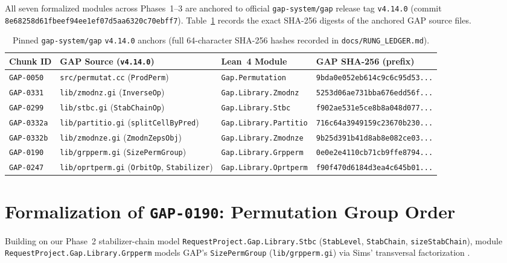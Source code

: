 \documentclass[11pt,a4paper]{article}
\begin{document}
All seven formalized modules across Phases~1--3 are anchored to official \texttt{gap-system/gap} release tag \texttt{v4.14.0} (commit \texttt{8e68258d61fb\allowbreak eef94ee1ef07\allowbreak d5aa6320c70ebff7}). Table~\ref{tab:anchors} records the exact SHA-256 digests of the anchored GAP source files.

\begin{table}[h!]
\centering
\scriptsize
\begin{tabularx}{\textwidth}{@{}l X l l@{}}
\toprule
\textbf{Chunk ID} & \textbf{GAP Source (\texttt{v4.14.0})} & \textbf{Lean~4 Module} & \textbf{GAP SHA-256 (prefix)} \\
\midrule
\texttt{GAP-0050} & \texttt{src/permutat.cc} (\texttt{ProdPerm}) & \texttt{Gap.Permutation} & \texttt{9bda0e052eb614c9c6c95d53...} \\
\texttt{GAP-0331} & \texttt{lib/zmodnz.gi} (\texttt{InverseOp}) & \texttt{Gap.Library.Zmodnz} & \texttt{5253d06ae731bba676edd56f...} \\
\texttt{GAP-0299} & \texttt{lib/stbc.gi} (\texttt{StabChainOp}) & \texttt{Gap.Library.Stbc} & \texttt{f902ae531e5ce8b8a048d077...} \\
\texttt{GAP-0332a} & \texttt{lib/partitio.gi} (\texttt{splitCellByPred}) & \texttt{Gap.Library.Partitio} & \texttt{716c64a3949159c23670b230...} \\
\texttt{GAP-0332b} & \texttt{lib/zmodnze.gi} (\texttt{ZmodnZepsObj}) & \texttt{Gap.Library.Zmodnze} & \texttt{9b25d391b41d8ab8e082ce03...} \\
\texttt{GAP-0190} & \texttt{lib/grpperm.gi} (\texttt{SizePermGroup}) & \texttt{Gap.Library.Grpperm} & \texttt{0e0e2e4110cb71cb9ffe8794...} \\
\texttt{GAP-0247} & \texttt{lib/oprtperm.gi} (\texttt{OrbitOp}, \texttt{Stabilizer}) & \texttt{Gap.Library.Oprtperm} & \texttt{f90f470d6184d3ea4c645b01...} \\
\bottomrule
\end{tabularx}
\caption{Pinned \texttt{gap-system/gap} \texttt{v4.14.0} anchors (full 64-character SHA-256 hashes recorded in \texttt{docs/RUNG\_LEDGER.md}).}
\label{tab:anchors}
\end{table}

\section{Formalization of \texttt{GAP-0190}: Permutation Group Order}
\label{sec:grpperm}

Building on our Phase~2 stabilizer-chain model \texttt{RequestProject.\allowbreak Gap.Library.\allowbreak Stbc} (\texttt{StabLevel}, \texttt{StabChain}, \texttt{sizeStabChain}), module \texttt{RequestProject.\allowbreak Gap.Library.\allowbreak Grpperm} models GAP's \texttt{SizePermGroup} (\texttt{lib/grpperm.gi}) via Sims' transversal factorization \cite{sims1970computational,seress2003permutation}.
\end{document}
